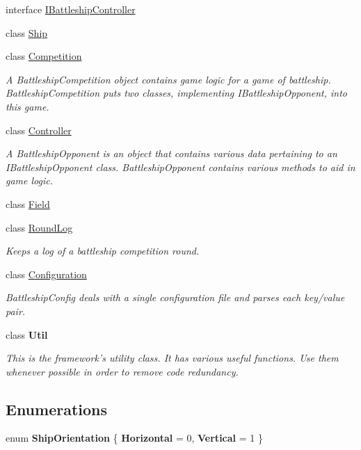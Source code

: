 \begin{DoxyCompactItemize}
\item 
interface \hyperlink{interface_m_b_c_1_1_core_1_1_i_battleship_controller}{I\-Battleship\-Controller}
\item 
class \hyperlink{class_m_b_c_1_1_core_1_1_ship}{Ship}
\item 
class \hyperlink{class_m_b_c_1_1_core_1_1_competition}{Competition}
\begin{DoxyCompactList}\small\item\em A Battleship\-Competition object contains game logic for a game of battleship. Battleship\-Competition puts two classes, implementing I\-Battleship\-Opponent, into this game.\end{DoxyCompactList}\item 
class \hyperlink{class_m_b_c_1_1_core_1_1_controller}{Controller}
\begin{DoxyCompactList}\small\item\em A Battleship\-Opponent is an object that contains various data pertaining to an I\-Battleship\-Opponent class. Battleship\-Opponent contains various methods to aid in game logic.\end{DoxyCompactList}\item 
class \hyperlink{class_m_b_c_1_1_core_1_1_field}{Field}
\item 
class \hyperlink{class_m_b_c_1_1_core_1_1_round_log}{Round\-Log}
\begin{DoxyCompactList}\small\item\em Keeps a log of a battleship competition round.\end{DoxyCompactList}\item 
class \hyperlink{class_m_b_c_1_1_core_1_1_configuration}{Configuration}
\begin{DoxyCompactList}\small\item\em Battleship\-Config deals with a single configuration file and parses each key/value pair.\end{DoxyCompactList}\item 
class {\bfseries Util}
\begin{DoxyCompactList}\small\item\em This is the framework's utility class. It has various useful functions. Use them whenever possible in order to remove code redundancy.\end{DoxyCompactList}\end{DoxyCompactItemize}
\subsection*{Enumerations}
\begin{DoxyCompactItemize}
\item 
enum {\bfseries Ship\-Orientation} \{ {\bfseries Horizontal} = 0, 
{\bfseries Vertical} = 1
 \}
\end{DoxyCompactItemize}
